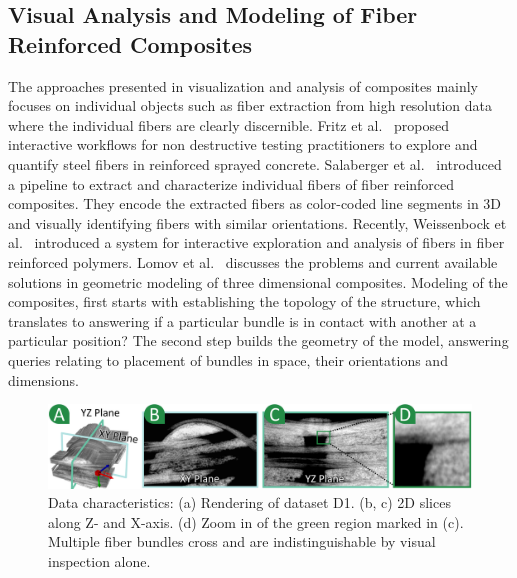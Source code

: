 \subsection {Visual Analysis and Modeling of Fiber Reinforced Composites}
The approaches presented in visualization and analysis of composites mainly focuses on individual objects such as fiber extraction from high resolution data where the individual fibers are clearly discernible. Fritz et al.~\cite{Fritz2009} proposed interactive workflows for non destructive testing practitioners to explore and quantify steel fibers in reinforced sprayed concrete. %
Salaberger et al.~\cite{Salaberger2011} introduced a pipeline to extract and characterize individual fibers of fiber reinforced composites. They encode the extracted fibers as color-coded line segments in 3D and visually identifying fibers with similar orientations.
Recently, Weissenbock et al.~\cite{Weissenbock2014} introduced a system for interactive exploration and analysis of fibers in fiber reinforced polymers. 
Lomov et al.~\cite{Lomov2010} discusses the problems and current available solutions in geometric modeling of three dimensional composites.
Modeling of the composites, first starts with establishing the topology of the structure, which translates to answering if a particular bundle is in contact with another at a particular position? The second step builds the geometry of the model, answering queries relating to placement of bundles in space, their orientations and dimensions. 
\begin{figure}[htb]
\centering
\includegraphics[width=\linewidth]{images/data-char.eps}
\caption
{
Data characteristics: (a) Rendering of dataset D1. (b, c) 2D slices along Z- and X-axis. (d) Zoom in of the green region marked in (c). Multiple fiber bundles cross and are indistinguishable by visual inspection alone. 
}
\label{fig:data-char}
\end{figure}


